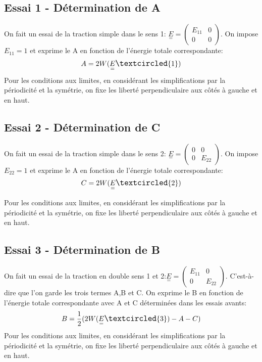 \documentclass{article}
\begin{document}
\subsection{Essai \large{\textcircled{\small{1}}} - Détermination de A}
On fait un essai de la traction simple dans le sens 1: $\underset{=}{E}=\begin{pmatrix}E_{11} & 0\\ 0 & 0 \end{pmatrix}$. On impose $E_{11}=1$ et exprime le A en fonction de l'énergie totale correspondante:\\
\begin{align*}
    A=2W(\underset{=}{E}\large{\textcircled{\small{1}}})
\end{align*}
Pour les conditions aux limites, en considérant les simplifications par la périodicité et la symétrie, on fixe les liberté perpendiculaire aux côtés à gauche et en haut. 

\subsection{Essai \large{\textcircled{\small{2}}} - Détermination de C} 
On fait un essai de la traction simple dans le sens 2: $\underset{=}{E}=\begin{pmatrix}0 & 0\\ 0 & E_{22} \end{pmatrix} $. On impose $E_{22}=1$ et exprime le A en fonction de l'énergie totale correspondante:\\
\begin{align*}
    C=2W(\underset{=}{E}\large{\textcircled{\small{2}}})
\end{align*}
\par
Pour les conditions aux limites, en considérant les simplifications par la périodicité et la symétrie, on fixe les liberté perpendiculaire aux côtés à gauche et en haut. 

\subsection{Essai \large{\textcircled{\small{3}}} - Détermination de B}
On fait un essai de la traction en double sens 1 et 2:$\underset{=}{E}=\begin{pmatrix} E_{11} & 0\\ 0 & E_{22}\end{pmatrix}$. C'est-à-dire que l'on garde les trois termes A,B et C. On exprime le B en fonction de l'énergie totale correspondante avec A et C déterminées dans les essais avants:\\
\begin{align*}
    B=\frac{1}{2}(2W(\underset{=}{E}\large{\textcircled{\small{3}}})-A-C)
\end{align*}
Pour les conditions aux limites, en considérant les simplifications par la périodicité et la symétrie, on fixe les liberté perpendiculaire aux côtés à gauche et en haut. 
\end{document}
